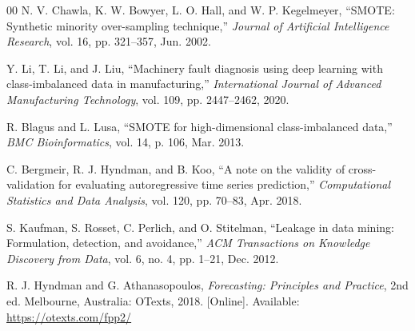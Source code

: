 \documentclass[conference]{IEEEtran}
\begin{document}
\begin{thebibliography}{00}
N. V. Chawla, K. W. Bowyer, L. O. Hall, and W. P. Kegelmeyer, ``SMOTE: Synthetic minority over-sampling technique,'' \textit{Journal of Artificial Intelligence Research}, vol. 16, pp. 321--357, Jun. 2002.

Y. Li, T. Li, and J. Liu, ``Machinery fault diagnosis using deep learning with class-imbalanced data in manufacturing,'' \textit{International Journal of Advanced Manufacturing Technology}, vol. 109, pp. 2447--2462, 2020.

R. Blagus and L. Lusa, ``SMOTE for high-dimensional class-imbalanced data,'' \textit{BMC Bioinformatics}, vol. 14, p. 106, Mar. 2013.

C. Bergmeir, R. J. Hyndman, and B. Koo, ``A note on the validity of cross-validation for evaluating autoregressive time series prediction,'' \textit{Computational Statistics and Data Analysis}, vol. 120, pp. 70--83, Apr. 2018.

S. Kaufman, S. Rosset, C. Perlich, and O. Stitelman, ``Leakage in data mining: Formulation, detection, and avoidance,'' \textit{ACM Transactions on Knowledge Discovery from Data}, vol. 6, no. 4, pp. 1--21, Dec. 2012.

R. J. Hyndman and G. Athanasopoulos, \textit{Forecasting: Principles and Practice}, 2nd ed. Melbourne, Australia: OTexts, 2018. [Online]. Available: \url{https://otexts.com/fpp2/}

\end{thebibliography}
\end{document}

